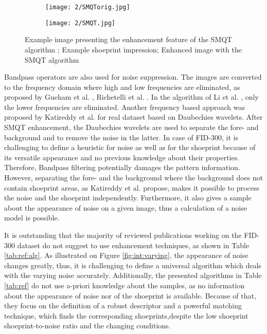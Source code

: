 \documentclass[draft,final]{vutinfth} %
\begin{document}
\begin{figure}[h]
  \centering
  \begin{subfigure}[t]{0.4\columnwidth}
    \centering
    \texttt{[image: 2/SMQTorig.jpg]}
    \subcaption{}
    \label{fig:rw:SMQTin}
  \end{subfigure}
  \begin{subfigure}[t]{0.4\columnwidth}
    \centering
    \texttt{[image: 2/SMQT.jpg]}
    \subcaption{}
    \label{fig:rw:SMQTout}
  \end{subfigure}
  \caption{Example image presenting the enhancement feature of the SMQT algorithm \cite{katireddy2017novel};
		 Example shoeprint impression;  Enhanced image with the SMQT algorithm}
  \label{fig:rw:SMQT} %
\end{figure}

\par
Bandpass operators are also used for noise suppression.
The images are converted to the frequency domain where high and low frequencies are eliminated, as proposed by Gueham et al. \cite{gueham2007automatic}, Richetelli et al. \cite{richetelli2017classification}.
In the algorithm of Li et al. \cite{li2014retrieval}, only the lower frequencies are eliminated.
Another frequency based approach was proposed by Katireddy et al. \cite{katireddy2017novel} for real dataset based on Daubechies wavelets.
After SMQT enhancement, the Daubechies wavelets are used to separate the fore- and background and to remove the noise in the latter.
In case of FID-300, it is challenging to define a heuristic for noise as well as for the shoeprint because of its versatile appearance and no previous knowledge about their properties.
Therefore, Bandpass filtering potentially damages the pattern information.
However, separating the fore- and the background where the background does not contain shoeprint areas, as Katireddy et al. \cite{katireddy2017novel} propose, makes it possible to process the noise and the shoeprint independently.
Furthermore, it also gives a sample about the appearance of noise on a given image, thus a calculation of a noise model is possible.

\par
It is outstanding that the majority of reviewed publications working on the FID-300 dataset do not suggest to use enhancement techniques, as shown in Table \ref{tab:ref:alg}.
As illustrated on Figure \ref{fig:int:varying}, the appearance of noise changes greatly, thus, it is challenging to define a universal algorithm which deals with the  varying noise accurately.
Additionally, the presented algorithms in Table \ref{tab:ref} do not use a-priori knowledge about the samples, as no information about the appearance of noise nor of the shoeprint is available.
Because of that, they focus on the definition of a robust descriptor and a powerful matching technique, which finds the corresponding shoeprints,despite the low shoeprint shoeprint-to-noise ratio and the changing conditions.
\end{document}
